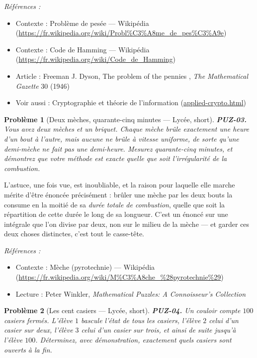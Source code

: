 \documentclass[11pt]{article}
\newtheorem{problem}{Problème}
\newenvironment{refs}{\par\small\noindent\emph{Références :}\begin{itemize}\setlength\itemsep{0pt}}{\end{itemize}\normalsize}
\begin{document}
\begin{refs}
\item Contexte : Problème de pesée --- Wikipédia (\url{https://fr.wikipedia.org/wiki/Probl%C3%A8me_de_pes%C3%A9e})
\item Contexte : Code de Hamming --- Wikipédia (\url{https://fr.wikipedia.org/wiki/Code_de_Hamming})
\item Article : Freeman J. Dyson, \og{} The problem of the pennies \fg{}, \textit{The Mathematical Gazette} 30 (1946)
\item Voir aussi : Cryptographie et théorie de l'information (\url{applied-crypto.html})
\end{refs}

\bigskip

\begin{problem}[{Deux mèches, quarante-cinq minutes --- Lycée, short}]
\textbf{PUZ-03.} Vous avez deux mèches et un briquet. Chaque mèche
brûle exactement une heure d'un bout à l'autre, mais aucune ne brûle à vitesse uniforme,
de sorte qu'une demi-mèche ne fait pas une demi-heure. Mesurez quarante-cinq minutes, et
démontrez que votre méthode est exacte quelle que soit l'irrégularité de la
combustion.
\end{problem}

\noindent L'astuce, une fois vue, est inoubliable, et la raison pour laquelle elle
marche mérite d'être énoncée précisément : brûler une mèche par les deux bouts la consume
en la moitié de sa \textit{durée totale de combustion}, quelle que soit la répartition de
cette durée le long de sa longueur. C'est un énoncé sur une intégrale que l'on divise par
deux, non sur le milieu de la mèche --- et garder ces deux choses distinctes, c'est tout le
casse-tête.

\begin{refs}
\item Contexte : Mèche (pyrotechnie) --- Wikipédia (\url{https://fr.wikipedia.org/wiki/M%C3%A8che_%28pyrotechnie%29})
\item Lecture : Peter Winkler, \textit{Mathematical Puzzles: A Connoisseur's Collection}
\end{refs}

\bigskip

\begin{problem}[{Les cent casiers --- Lycée, short}]
\textbf{PUZ-04.} Un couloir compte $ 100 $ casiers fermés. L'élève
$ 1 $ bascule l'état de tous les casiers, l'élève $ 2 $ celui d'un casier sur deux,
l'élève $ 3 $ celui d'un casier sur trois, et ainsi de suite jusqu'à l'élève
$ 100 $. Déterminez, avec démonstration, exactement quels casiers sont ouverts à la
fin.
\end{problem}
\end{document}
